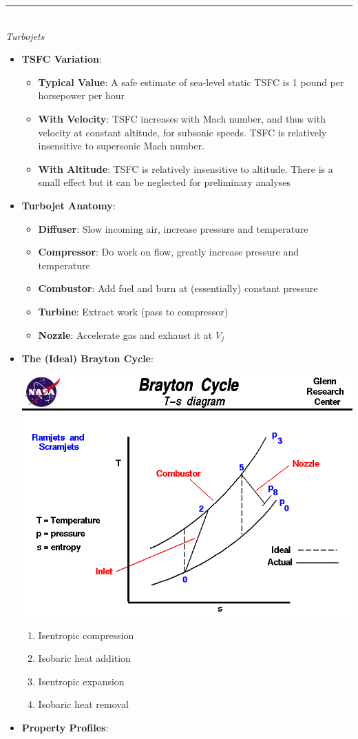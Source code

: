 \documentclass[12pt]{article}
\newcommand{\Item}[1]{\item \textbf{#1}:}
\newcommand{\Header}[1]{\noindent\rule{\textwidth}{0.4pt}\\\large{\textit{#1}}\normalsize{}}
\begin{document}
\Header{Turbojets}\\
\begin{itemize}
\Item{TSFC Variation}
	\begin{itemize}
	\Item{Typical Value} A safe estimate of sea-level static TSFC is 1 pound per horsepower per hour
	\Item{With Velocity} TSFC increases with Mach number, and thus with velocity at constant altitude, for subsonic speeds. TSFC is relatively insensitive to supersonic Mach number.
	\Item{With Altitude} TSFC is relatively insensitive to altitude. There is a small effect but it can be neglected for preliminary analyses
	\end{itemize}
\Item{Turbojet Anatomy}
	\begin{itemize}
	\Item{Diffuser} Slow incoming air, increase pressure and temperature
	\Item{Compressor} Do work on flow, greatly increase pressure and temperature
	\Item{Combustor} Add fuel and burn at (essentially) constant pressure
	\Item{Turbine} Extract work (pass to compressor)
	\Item{Nozzle} Accelerate gas and exhaust it at $V_j$
	\end{itemize}
\Item{The (Ideal) Brayton Cycle}\\

\begin{minipage}{0.48\textwidth}
	\includegraphics[width=\textwidth]{Graphics/brayton.png}
\end{minipage}
\begin{minipage}{0.48\textwidth}
	\begin{enumerate}
	\item Isentropic compression
	\item Isobaric heat addition
	\item Isentropic expansion
	\item Isobaric heat removal
	\end{enumerate}
\end{minipage}
\Item{Property Profiles}\\


\end{itemize}
\end{document}
